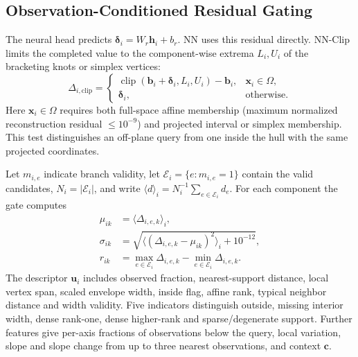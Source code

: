 \subsection{Observation-Conditioned Residual Gating}
The neural head predicts $\boldsymbol\delta_i=W_r\mathbf h_i+b_r$. NN uses this residual directly. NN-Clip limits the completed value to the component-wise extrema $L_i,U_i$ of the bracketing knots or simplex vertices:
\begin{equation}
\Delta_{i,\mathrm{clip}}=
\begin{cases}
\operatorname{clip}(\mathbf b_i+\boldsymbol\delta_i,L_i,U_i)-\mathbf b_i,&\mathbf x_i\in\Omega,\\
\boldsymbol\delta_i,&\text{otherwise}.
\end{cases}
\end{equation}
Here $\mathbf x_i\in\Omega$ requires both full-space affine membership (maximum normalized reconstruction residual $\le10^{-9}$) and projected interval or simplex membership. This test distinguishes an off-plane query from one inside the hull with the same projected coordinates.

Let $m_{i,e}$ indicate branch validity, let $\mathcal E_i=\{e:m_{i,e}=1\}$ contain the valid candidates, $N_i=|\mathcal E_i|$, and write $\langle d\rangle_i=N_i^{-1}\sum_{e\in\mathcal E_i}d_e$. For each component the gate computes
\begin{align}
\mu_{ik}&=\langle\Delta_{i,e,k}\rangle_i,\\
\sigma_{ik}&=\sqrt{\langle(\Delta_{i,e,k}-\mu_{ik})^2\rangle_i+10^{-12}},\\
r_{ik}&=\max_{e\in\mathcal E_i}\Delta_{i,e,k}-\min_{e\in\mathcal E_i}\Delta_{i,e,k}.
\end{align}
The descriptor $\mathbf u_i$ includes observed fraction, nearest-support distance, local vertex span, scaled envelope width, inside flag, affine rank, typical neighbor distance and width validity. Five indicators distinguish outside, missing interior width, dense rank-one, dense higher-rank and sparse/degenerate support. Further features give per-axis fractions of observations below the query, local variation, slope and slope change from up to three nearest observations, and context $\mathbf c$.
\ifdefined\CapFillExtended\fi

